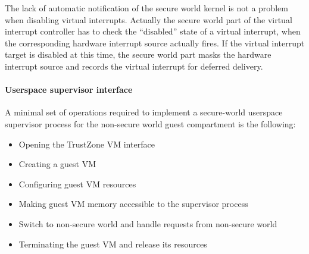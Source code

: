 \documentclass{article}
\begin{document}
The lack of automatic notification of the secure world kernel is not a problem when disabling virtual interrupts. Actually the secure world part of the virtual interrupt controller has to check the “disabled” state of a virtual interrupt, when the corresponding hardware interrupt source actually fires. If the virtual interrupt target is disabled at this time, the secure world part masks the hardware interrupt source and records the virtual interrupt for deferred delivery.

\paragraph{Userspace supervisor interface}

A minimal set of operations required to implement a secure-world userspace supervisor process for the non-secure world guest compartment is the following:\begin{itemize}
\item Opening the TrustZone VM interface
\item Creating a guest VM
\item Configuring guest VM resources
\item Making guest VM memory accessible to the supervisor process
\item Switch to non-secure world and handle requests from non-secure world
\item Terminating the guest VM and release its resources
\end{itemize}
\end{document}
